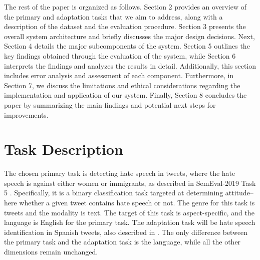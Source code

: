 \documentclass[11pt,a4paper]{article}
\begin{document}
   The rest of the paper is organized as follows. Section 2 provides an overview of the primary and adaptation tasks that we aim to address, along with a description of the dataset and the evaluation procedure. Section 3 presents the overall system architecture and briefly discusses the major design decisions. Next, Section 4 details the major subcomponents of the system. Section 5 outlines the key findings obtained through the evaluation of the system, while Section 6 interprets the findings and analyzes the results in detail. Additionally, this section includes error analysis and assessment of each component. Furthermore, in Section 7, we discuss the limitations and ethical considerations regarding the implementation and application of our system. Finally, Section 8 concludes the paper by summarizing the main findings and potential next steps for improvements.




\section{Task Description}
 The chosen primary task is detecting hate speech in tweets, where the hate speech is against either women or immigrants, as described in SemEval-2019 Task 5 \citep{basile-etal-2019-semeval}. Specifically, it is a binary classification task targeted at determining attitude–here whether a given tweet contains hate speech or not. The genre for this task is tweets and the modality is text. The target of this task is aspect-specific, and the language is English for the primary task. The adaptation task will be hate speech identification in Spanish tweets, also described in \citet{basile-etal-2019-semeval}. The only difference between the primary task and the adaptation task is the language, while all the other dimensions remain unchanged.
\end{document}
